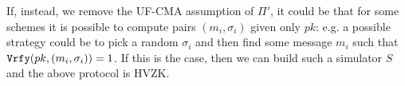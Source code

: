 \begin{enumerate}[(a)]
\begin{solution}
		      If, instead, we remove the UF-CMA assumption of $\Pi'$, it could be that for some schemes it is possible to compute pairs $(m_i, \sigma_i)$ given only $pk$: e.g. a possible strategy could be to pick a random $\sigma_i$ and then find some message $m_i$ such that $\texttt{Vrfy}(pk, (m_i, \sigma_i)) = 1$. If this is the case, then we can build such a simulator $S$ and the above protocol is HVZK.
	      \end{solution}
\end{enumerate}